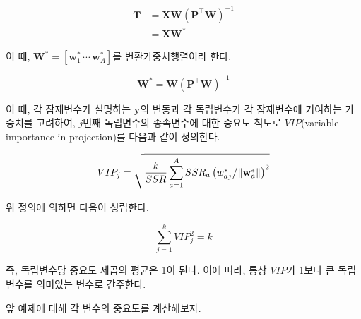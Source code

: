 \documentclass[]{book}
\newenvironment{Shaded}{\begin{snugshade}}{\end{snugshade}}
\newcommand{\DecValTok}[1]{\textcolor[rgb]{0.00,0.00,0.81}{#1}}
\newcommand{\KeywordTok}[1]{\textcolor[rgb]{0.13,0.29,0.53}{\textbf{#1}}}
\newcommand{\NormalTok}[1]{#1}
\newcommand{\OperatorTok}[1]{\textcolor[rgb]{0.81,0.36,0.00}{\textbf{#1}}}
\newcommand{\StringTok}[1]{\textcolor[rgb]{0.31,0.60,0.02}{#1}}
\begin{document}
\begin{equation}
\begin{split}
\mathbf{T} &= \mathbf{X} \mathbf{W} \left(\mathbf{P}^\top \mathbf{W}\right)^{-1}\\
&= \mathbf{X} \mathbf{W}^{*}
\end{split}
\end{equation}

이 때, \(\mathbf{W}^{*} = \left[\mathbf{w}^{*}_1 \, \cdots \, \mathbf{w}^{*}_A \right]\)를 변환가중치행렬이라 한다.

\begin{equation}
\mathbf{W}^{*} = \mathbf{W} \left(\mathbf{P}^\top \mathbf{W}\right)^{-1}
\end{equation}

이 때, 각 잠재변수가 설명하는 \(\mathbf{y}\)의 변동과 각 독립변수가 각 잠재변수에 기여하는 가중치를 고려하여, \(j\)번째 독립변수의 종속변수에 대한 중요도 척도로 \(VIP\)(variable importance in projection)를 다음과 같이 정의한다.

\begin{equation}
VIP_j = \sqrt{\frac{k}{SSR} \sum_{a = 1}^{A} SSR_a \left( w^{*}_{aj} \middle/ \| \mathbf{w}^{*}_a \|  \right)^2} \label{eq:plsr-single-vip}
\end{equation}

위 정의에 의하면 다음이 성립한다.

\[
\sum_{j = 1}^{k} VIP_j^2 = k
\]

즉, 독립변수당 중요도 제곱의 평균은 1이 된다. 이에 따라, 통상 \(VIP\)가 1보다 큰 독립변수를 의미있는 변수로 간주한다.

앞 예제에 대해 각 변수의 중요도를 계산해보자.

\begin{Shaded}
\end{Shaded}
\end{document}
